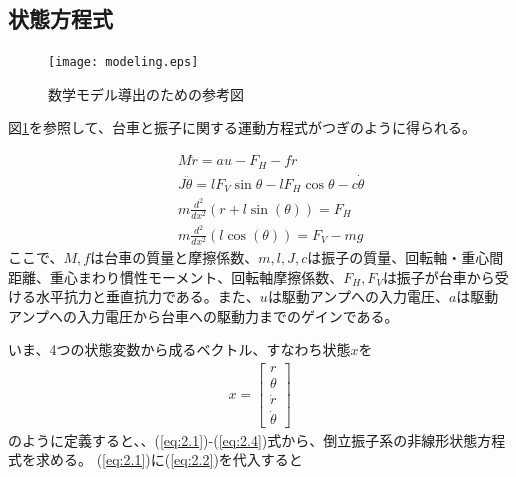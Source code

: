 \documentclass[a4j,11pt,twoside]{ujbook}
\begin{document}
\subsection{状態方程式}
\begin{figure}[htbp]
	\begin{center}
		\texttt{[image: modeling.eps]}
		\caption{数学モデル導出のための参考図}
		\label{fig:数式モデル導出のための参考図}
	\end{center}
\end{figure}

図\ref{fig:数式モデル導出のための参考図}を参照して、台車と振子に関する運動方程式がつぎのように得られる。

\begin{eqnarray}
&&M \ddot{r} = au - F_H - f \dot{r}
\label{eq:2.1}\\
&&J \ddot{\theta} = lF_V\sin{\theta} - lF_H\cos{\theta} - c\dot{\theta}
\label{eq:2.2}\\
&&m \frac{d^2}{dx^2} (r + l\sin(\theta))  =  F_H
\label{eq:2.3}\\
&&m \frac{d^2}{dx^2} (l\cos(\theta))  =  F_V - mg
\label{eq:2.4}
\end{eqnarray}
ここで、$M,f$は台車の質量と摩擦係数、$m,l,J,c$は振子の質量、回転軸・重心間距離、重心まわり慣性モーメント、回転軸摩擦係数、$F_H,F_V$は振子が台車から受ける水平抗力と垂直抗力である。また、$u$は駆動アンプへの入力電圧、$a$は駆動アンプへの入力電圧から台車への駆動力までのゲインである。

いま、4つの状態変数から成るベクトル、すなわち状態$x$を
\begin{eqnarray}
	x=\left[
	\begin{array}{c}
		r\\
		\theta\\
		\dot{r}\\
		\dot{\theta}
	\end{array}
	\right]
\end{eqnarray}
のように定義すると、、(\ref{eq:2.1})-(\ref{eq:2.4})式から、倒立振子系の非線形状態方程式を求める。
(\ref{eq:2.1})に(\ref{eq:2.2})を代入すると
\end{document}
